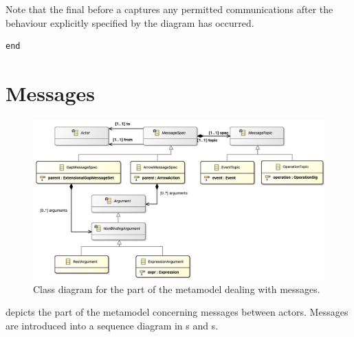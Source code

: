 




Note that the final \msequencegap{} before a \mfinalaction{} captures
any permitted communications after the behaviour explicitly specified by the
diagram has occurred.

\begin{lstlisting}[style=Example]
end
\end{lstlisting}


\section{Messages}\label{sec:metamodel-messages}

\begin{figure}
	\centering
	\includegraphics[width=\textwidth]{diagrams/messages.png}
	\caption{Class diagram for the part of the \langname{} metamodel dealing with messages.}
	\label{fig:metamodel-messages}
\end{figure}

 depicts the part of the metamodel concerning
messages between actors.  Messages are introduced into a sequence diagram
in \mgapmessageset s and \marrowaction s.


